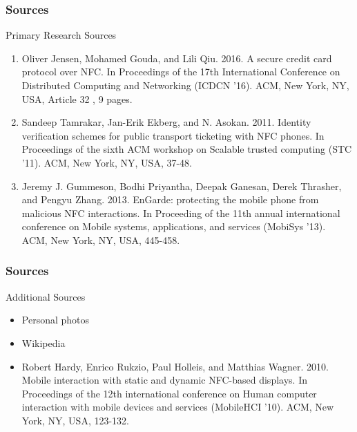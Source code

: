 \documentclass[unknownkeysallowed]{beamer}
\begin{document}
\begin{frame}
  \frametitle{Sources}
  \begin{block}{Primary Research Sources}
    \begin{enumerate}
      \item{Oliver Jensen, Mohamed Gouda, and Lili Qiu. 2016. A secure credit card protocol over NFC. In Proceedings of the 17th International Conference on Distributed Computing and Networking (ICDCN '16). ACM, New York, NY, USA, Article 32 , 9 pages. %
      }
      \item{Sandeep Tamrakar, Jan-Erik Ekberg, and N. Asokan. 2011. Identity verification schemes for public transport ticketing with NFC phones. In Proceedings of the sixth ACM workshop on Scalable trusted computing (STC '11). ACM, New York, NY, USA, 37-48. %
      }
      \item{Jeremy J. Gummeson, Bodhi Priyantha, Deepak Ganesan, Derek Thrasher, and Pengyu Zhang. 2013. EnGarde: protecting the mobile phone from malicious NFC interactions. In Proceeding of the 11th annual international conference on Mobile systems, applications, and services (MobiSys '13). ACM, New York, NY, USA, 445-458. %
      }
    \end{enumerate}
  \end{block}
\end{frame}

\begin{frame}
  \frametitle{Sources}
  \begin{block}{Additional Sources}
    \begin{itemize}
      \item{Personal photos
      }
      \item{Wikipedia}
      \item{Robert Hardy, Enrico Rukzio, Paul Holleis, and Matthias Wagner. 2010. Mobile interaction with static and dynamic NFC-based displays. In Proceedings of the 12th international conference on Human computer interaction with mobile devices and services (MobileHCI '10). ACM, New York, NY, USA, 123-132. %
      }
    \end{itemize}
  \end{block}
\end{frame}
\end{document}
